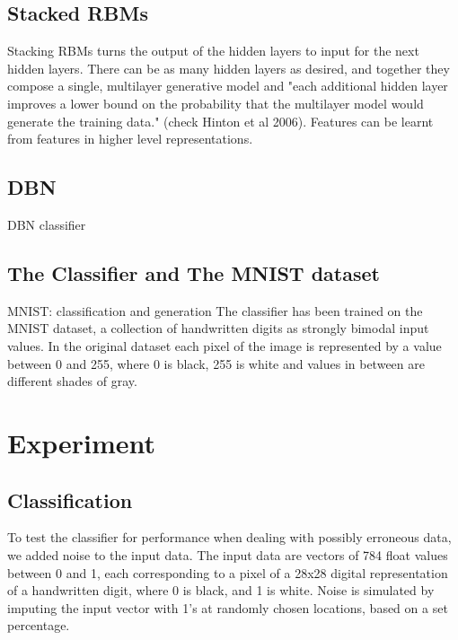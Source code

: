\documentclass{report}
\begin{document}
\subsection{Stacked RBMs}
Stacking RBMs turns the output of the hidden layers to input for the next hidden layers. There can be as many hidden layers as desired, and together they compose a single, multilayer generative model and "each additional hidden layer improves a lower bound on the probability that the multilayer model would generate the training data." (check Hinton et al 2006). Features can be learnt from features in higher level representations.  


\subsection{DBN}
DBN classifier

\subsection{The Classifier and The MNIST dataset}
MNIST: classification and generation
The classifier has been trained on the MNIST dataset, a collection of handwritten digits as strongly bimodal input values. In the original dataset each pixel of the image is represented by a value between 0 and 255, where 0 is black, 255 is white and values in between are different shades of gray.

\section{Experiment}
\subsection{Classification}
To test the classifier for performance when dealing with possibly erroneous data, we added noise to the input data. The input data are vectors of 784 float values between 0 and 1, each corresponding to a pixel of a 28x28 digital representation of a handwritten digit, where 0 is black, and 1 is white. Noise is simulated by imputing the input vector with 1's at randomly chosen locations, based on a set percentage. 
\end{document}
